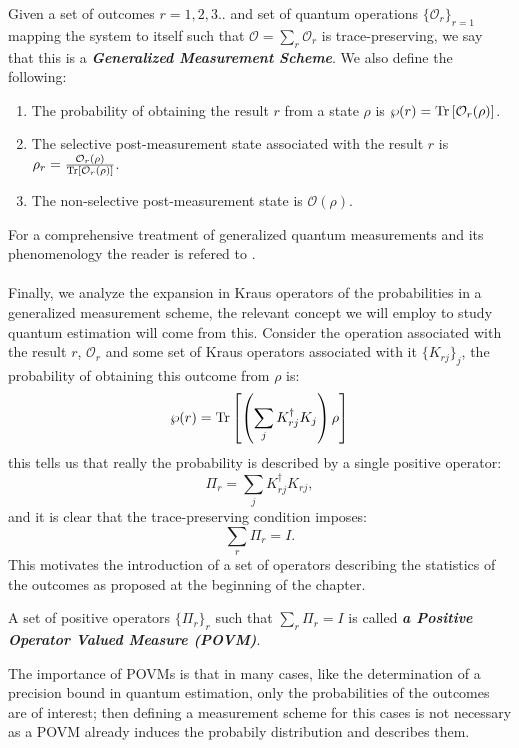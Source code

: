 \begin{definition}
  Given a set of outcomes $r=1,2,3..$ and set of quantum operations $\{\mathcal{O}_{r}\}_{r=1}$ mapping the system to itself such that $\mathcal{O}=\sum_{r}\mathcal{O}_{r}$ is trace-preserving, we say that this is a \textit{\textbf{Generalized Measurement Scheme}}.
  We also define the following:
  \begin{enumerate}
    \item The probability of obtaining the result $r$ from a state $\rho$ is $\wp(r) = \mathrm{Tr}\left[\mathcal{O}_{r}(\rho)\right]$.
    \item The selective post-measurement state associated with the result $r$ is $\rho_{r} = \frac{\mathcal{O}_{r}(\rho)}{\mathrm{Tr}\left[\mathcal{O}_{r}(\rho)\right]}$.
    \item The non-selective post-measurement state is $\mathcal{O}(\rho)$.
  \end{enumerate}
\end{definition}
For a comprehensive treatment of generalized quantum measurements and its phenomenology the reader is refered to \cite{wiseman_quantum_2010}.
\\\\
Finally, we analyze the expansion in Kraus operators of the probabilities in a generalized measurement scheme, the relevant concept
we will employ to study quantum estimation will come from this. Consider the operation associated with the result $r$, $\mathcal{O}_{r}$
and some set of Kraus operators associated with it $\{K_{rj}\}_{j}$, the probability of obtaining this outcome from $\rho$ is:
\begin{equation}
  \wp(r) = \mathrm{Tr}\left[\left(\sum_{j}K_{rj}^{\dagger}K_{j}\right)\rho\right]
\end{equation}
this tells us that really the probability is described by a single positive operator:
\begin{equation}\label{eq:sum_POVM}
\Pi_{r} = \sum_{j}K_{rj}^{\dagger}K_{rj},
\end{equation}
and it is clear that the trace-preserving condition imposes:
\begin{equation}\label{eq:sum_POVM}
\sum_{r}\Pi_{r} = I.
\end{equation}
This motivates the introduction of a set of operators describing the statistics of the outcomes as proposed at the beginning of the chapter.

\begin{definition}
  A set of positive operators $\{\Pi_{r}\}_{r}$ such that $\sum_{r}\Pi_{r}=I$ is called \textit{\textbf{a Positive Operator Valued Measure (POVM)}}.
\end{definition}
The importance of POVMs is that in many cases, like the determination of a precision bound in  quantum estimation, only the probabilities of the outcomes are of interest; then defining a measurement scheme for this cases is not necessary as a POVM already induces the probabily distribution and describes them.


